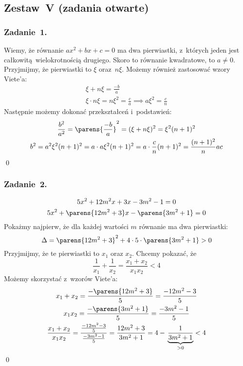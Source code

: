 \subsection*{Zestaw~V (zadania otwarte)}
\subsubsection*{Zadanie~1.}
Wiemy, że równanie \(ax^2 + bx + c = 0\) ma dwa pierwiastki, z~których jeden jest całkowitą wielokrotnością drugiego. Skoro to równanie kwadratowe, to \(a \neq 0\). Przyjmijmy, że pierwiastki to \(\xi\) oraz~\(n\xi\). Możemy również zastosować wzory Viete'a:
\begin{gather*}
    \xi + n\xi = \frac{-b}{a}\\
    \xi \cdot n\xi = n\xi^2 = \frac{c}{a} \implies a\xi^2 = \frac{c}{n}
\end{gather*}
Następnie możemy dokonać przekształceń i~podstawień:
\begin{gather*}
    \frac{b^2}{a^2} = \parens{\frac{-b}{a}}^2 = (\xi + n\xi)^2 = \xi^2(n + 1)^2\\
    b^2 = a^2\xi^2(n + 1)^2 = a \cdot a\xi^2(n + 1)^2 = a \cdot \frac{c}{n}(n + 1)^2 = \frac{(n + 1)^2}{n}ac
\end{gather*}
\qed
\subsubsection*{Zadanie~2.}
\begin{gather*}
    5x^2 + 12m^2x + 3x - 3m^2 - 1 = 0\\
    5x^2 + \parens{12m^2 + 3}x - \parens{3m^2 + 1} = 0
\end{gather*}
Pokażmy najpierw, że dla każdej wartości \(m\) równanie ma dwa pierwiastki:
\begin{equation*}
    \Delta = \parens{12m^2 + 3}^2 + 4 \cdot 5 \cdot \parens{3m^2 + 1} > 0
\end{equation*}
Przyjmijmy, że te pierwiastki to \(x_1\) oraz \(x_2\). Chcemy pokazać, że
\begin{equation*}
    \frac{1}{x_1} + \frac{1}{x_2} = \frac{x_1 + x_2}{x_1x_2} < 4
\end{equation*}
Możemy skorzystać z~wzorów Viete'a:
\begin{gather*}
    x_1 + x_2 = \frac{-\parens{12m^2 + 3}}{5} = \frac{-12m^2 - 3}{5}\\
    x_1x_2 = \frac{-\parens{3m^2 + 1}}{5} = \frac{-3m^2 - 1}{5}\\
    \frac{x_1 + x_2}{x_1x_2} = \frac{\frac{-12m^2 - 3}{5}}{\frac{-3m^2 - 1}{5}} = \frac{12m^2 + 3}{3m^2 + 1} = 4 - {}\underbrace{\frac{1}{3m^2 + 1}}_{> 0} < 4
\end{gather*}
\qed
